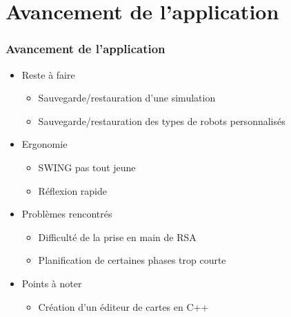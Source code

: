 \section{Avancement de l'application}
\begin{frame}
\frametitle{Avancement de l'application}
\begin{itemize}
	\item Reste à faire
	\begin{itemize}
		\item Sauvegarde/restauration d'une simulation
		\item Sauvegarde/restauration des types de robots personnalisés
	\end{itemize}
	\item Ergonomie
	\begin{itemize}
		\item SWING pas tout jeune
		\item Réflexion rapide
	\end{itemize}
	\item Problèmes rencontrés
	\begin{itemize}
		\item Difficulté de la prise en main de RSA
		\item Planification de certaines phases trop courte
	\end{itemize}
	\item Points à noter
	\begin{itemize}
		\item Création d'un éditeur de cartes en C++
	\end{itemize}
\end{itemize}
\end{frame}
